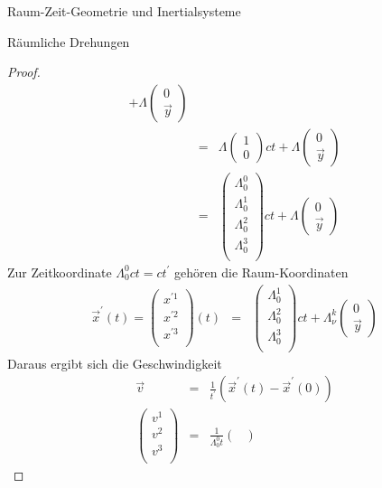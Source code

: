 \begin{chapter}{\titlestr}
\begin{section}{Raum-Zeit-Geometrie und Inertialsysteme}
\begin{subsection}{Räumliche Drehungen}
\begin{proof}
\begin{eqnarray*}
+
\Lambda
\begin{pmatrix}
0\\ \vec{y}
\end{pmatrix}\\
&=& \Lambda\begin{pmatrix}
1\\0
\end{pmatrix}ct
+
\Lambda
\begin{pmatrix}
0\\ \vec{y}
\end{pmatrix}\\
&=&\begin{pmatrix}
\Lambda^0_0\\
\Lambda^1_0\\
\Lambda^2_0\\
\Lambda^3_0\\
\end{pmatrix}ct
+
\Lambda
\begin{pmatrix}
0\\ \vec{y}
\end{pmatrix}
\end{eqnarray*}
Zur Zeitkoordinate $\Lambda^0_0ct=ct^\prime$ gehören die Raum-Koordinaten
\begin{eqnarray*}
\vec{x}^\prime(t)=
\begin{pmatrix}
x^{\prime 1}\\
x^{\prime 2}\\
x^{\prime 3}\\
\end{pmatrix}(t) 
&=&\begin{pmatrix}
\Lambda^1_0\\
\Lambda^2_0\\
\Lambda^3_0\\
\end{pmatrix}ct
+
\Lambda^k_\nu
\begin{pmatrix}
0\\ \vec{y}
\end{pmatrix}
\end{eqnarray*}
Daraus ergibt sich die Geschwindigkeit
\begin{eqnarray*}
\vec{v} &=& \frac{1}{t^\prime}\left(\vec{x}^\prime(t)-\vec{x}^\prime(0)\right)\\
\begin{pmatrix}
v^1\\
v^2\\
v^3\\
\end{pmatrix}&=& \frac{1}{\Lambda^0_0t}\begin{pmatrix}

\end{pmatrix}
\end{eqnarray*}
\end{proof}
\end{subsection}
\end{section}
\end{chapter}
